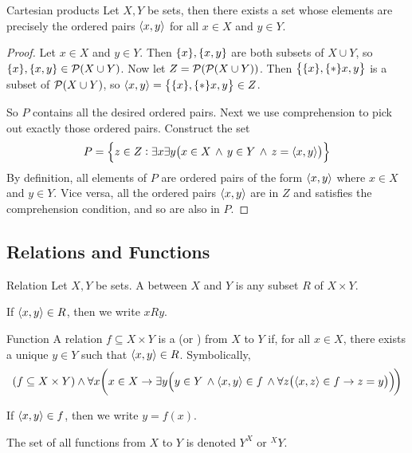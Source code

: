 \documentclass{styles/tufte}
\begin{document}
\begin{proposition}{Cartesian products}{}
  Let $X, Y$ be sets, then there exists a set whose elements are precisely the ordered pairs $\langle x, y\rangle$ for all $x \in X$ and $y \in Y$.
\end{proposition}
\begin{proof}
  Let $x \in X$ and $y \in Y$. Then $\set{x}, \set{x, y}$ are both subsets of $X \cup Y$, so $\set{x}, \set{x, y} \in \power(X \cup Y)$. Now let $Z = \mathcal{P}(\mathcal{P}(X \cup Y))$. Then $\set{\set{x}, \set*{x, y}}$ is a subset of $\mathcal{P}(X \cup Y)$, so $\opair{x, y} = \set{\set{x}, \set*{x, y}} \in Z$.
  
  So $P$ contains all the desired ordered pairs. Next we use comprehension to pick out exactly those ordered pairs. Construct the set
  \[ P = \set{z \in Z: \exists x \exists y \left(x \in X \,\land\, y \in Y \,\land\, z = \opair{x, y}\right)} \]
  By definition, all elements of $P$ are ordered pairs of the form $\langle x, y\rangle$ where $x \in X$ and $y \in Y$. Vice versa, all the ordered pairs $\langle x, y\rangle$ are in $Z$ and satisfies the comprehension condition, and so are also in $P$.
\end{proof}


\subsection{Relations and Functions}
  
  \begin{definition}{Relation}{}
    Let $X, Y$ be sets. A  between $X$ and $Y$ is any subset $R$ of $X \times Y$.
    
    If $\langle x, y\rangle \in R$, then we write $xRy$.
  \end{definition}
  
  \begin{definition}{Function}{}
    A relation $f \subseteq X \times Y$ is a  (or ) from $X$ to $Y$ if, for all $x \in X$, there exists a unique $y \in Y$ such that $\langle x, y\rangle \in R$. Symbolically,
    \[ (f \subseteq X \times Y) \land \forall x \left(x \in X \implies \exists y \left(y \in Y \,\land \opair{x, y} \in f \,\land \forall z \left(\opair{x, z} \in f \implies z = y\right)\right)\!\right) \]
    
    If $\langle x, y\rangle \in f$, then we write $y = f(x)$.
    
    The set of all functions from $X$ to $Y$ is denoted $Y^X$ or $^X Y$.
  \end{definition}
  
\end{document}
